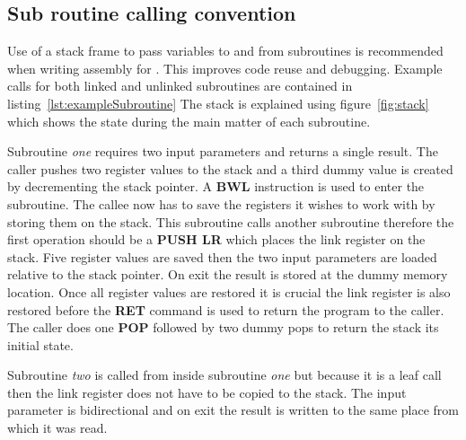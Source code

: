 \subsection{Sub routine calling convention}
\label{sec:subroutine_calls}

Use of a stack frame to pass variables to and from subroutines is recommended when writing assembly for \samurai{}.
This improves code reuse and debugging. 
Example calls for both linked and unlinked subroutines are contained in listing~\ref{lst:exampleSubroutine}
The stack is explained using figure~\ref{fig:stack} which shows the state during the main matter of each subroutine.

Subroutine \emph{one} requires two input parameters and returns a single result.
The caller pushes two register values to the stack and a third dummy value is created by decrementing the stack pointer.
A \textbf{BWL} instruction is used to enter the subroutine.
The callee now has to save the registers it wishes to work with by storing them on the stack.
This subroutine calls another subroutine therefore the first operation should be a \textbf{PUSH LR} which places the link register on the stack.
Five register values are saved then the two input parameters are loaded relative to the stack pointer.
On exit the result is stored at the dummy memory location.
Once all register values are restored it is crucial the link register is also restored before the \textbf{RET} command is used to return the program to the caller. 
The caller does one \textbf{POP} followed by two dummy pops to return the stack its initial state.

Subroutine \emph{two} is called from inside subroutine \emph{one} but because it is a leaf call then the link register does not have to be copied to the stack.
The input parameter is bidirectional and on exit the result is written to the same place from which it was read.

\begin{minipage}{\linewidth}

\end{minipage}

